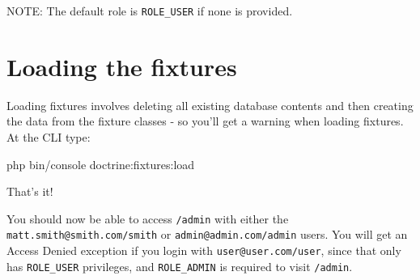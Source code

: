 \documentclass[a4paperpaper,openright]{book}
\newenvironment{Shaded}{}{}
\newcommand{\CommentTok}[1]{\textcolor[rgb]{0.38,0.63,0.69}{\textit{#1}}}
\newcommand{\ExtensionTok}[1]{#1}
\newcommand{\KeywordTok}[1]{\textcolor[rgb]{0.00,0.44,0.13}{\textbf{#1}}}
\newcommand{\NormalTok}[1]{#1}
\newcommand{\OtherTok}[1]{\textcolor[rgb]{0.00,0.44,0.13}{#1}}
\newcommand{\StringTok}[1]{\textcolor[rgb]{0.25,0.44,0.63}{#1}}
\begin{document}
\begin{Shaded}
\end{Shaded}

NOTE: The default role is \texttt{ROLE\_USER} if none is provided.

\hypertarget{loading-the-fixtures-1}{%
\section{Loading the fixtures}\label{loading-the-fixtures-1}}

Loading fixtures involves deleting all existing database contents and
then creating the data from the fixture classes - so you'll get a
warning when loading fixtures. At the CLI type:

\begin{Shaded}
\begin{Highlighting}[]
    \ExtensionTok{php}\NormalTok{ bin/console doctrine:fixtures:load}
\end{Highlighting}
\end{Shaded}

That's it!

You should now be able to access \texttt{/admin} with either the
\texttt{matt.smith@smith.com/smith} or \texttt{admin@admin.com/admin}
users. You will get an Access Denied exception if you login with
\texttt{user@user.com/user}, since that only has \texttt{ROLE\_USER}
privileges, and \texttt{ROLE\_ADMIN} is required to visit
\texttt{/admin}.
\end{document}
